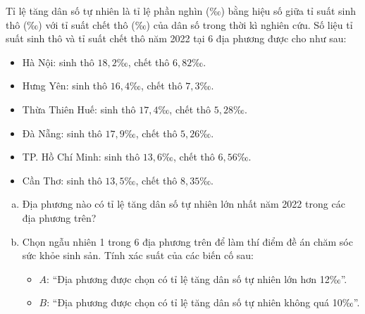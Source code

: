 \begin{bt}%
Tỉ lệ tăng dân số tự nhiên là tỉ lệ phần nghìn (‰) bằng hiệu số giữa tỉ suất sinh thô (‰) với tỉ suất chết thô (‰) của dân số trong thời kì nghiên cứu.
Số liệu tỉ suất sinh thô và tỉ suất chết thô năm 2022 tại 6 địa phương được cho như sau:
\begin{itemize}
    \item Hà Nội: sinh thô $18{,}2$‰, chết thô $6{,}82$‰.
    \item Hưng Yên: sinh thô $16{,}4$‰, chết thô $7{,}3$‰.
    \item Thừa Thiên Huế: sinh thô $17{,}4$‰, chết thô $5{,}28$‰.
    \item Đà Nẵng: sinh thô $17{,}9$‰, chết thô $5{,}26$‰.
    \item TP. Hồ Chí Minh: sinh thô $13{,}6$‰, chết thô $6{,}56$‰.
    \item Cần Thơ: sinh thô $13{,}5$‰, chết thô $8{,}35$‰.
\end{itemize}
\begin{enumerate}[a)]
    \item Địa phương nào có tỉ lệ tăng dân số tự nhiên lớn nhất năm 2022 trong các địa phương trên?
    \item Chọn ngẫu nhiên 1 trong 6 địa phương trên để làm thí điểm đề án chăm sóc sức khỏe sinh sản. Tính xác suất của các biến cố sau:
    \begin{itemize}
        \item $A$: “Địa phương được chọn có tỉ lệ tăng dân số tự nhiên lớn hơn 12‰”.
        \item $B$: “Địa phương được chọn có tỉ lệ tăng dân số tự nhiên không quá 10‰”.
    \end{itemize}
\end{enumerate}
\end{bt}

